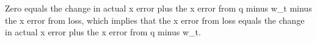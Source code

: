 Zero equals the change in actual x error plus the x error from q minus w_t minus the x error from loss, which implies that the x error from loss equals the change in actual x error plus the x error from q minus w_t.